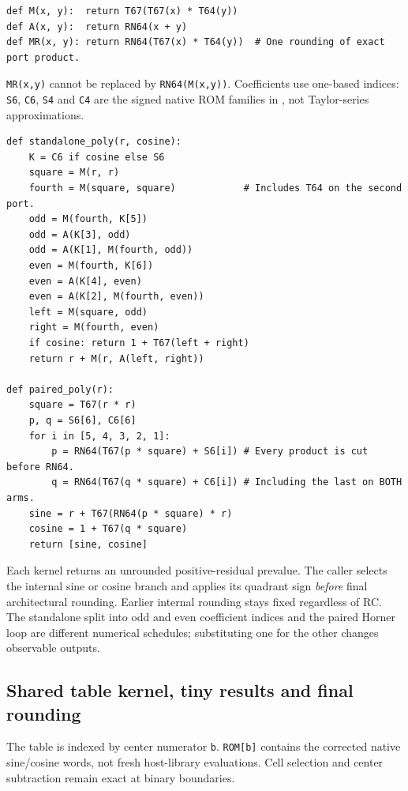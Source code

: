 \documentclass[11pt]{article}
\begin{document}
\begin{lstlisting}[style=pseudocode]
def M(x, y):  return T67(T67(x) * T64(y))
def A(x, y):  return RN64(x + y)
def MR(x, y): return RN64(T67(x) * T64(y))  # One rounding of exact port product.
\end{lstlisting}

\noindent \texttt{MR(x,y)} cannot be replaced by \texttt{RN64(M(x,y))}.
Coefficients use one-based indices: \texttt{S6}, \texttt{C6}, \texttt{S4}
and \texttt{C4} are the signed native ROM families in
, not Taylor-series approximations.

\begin{lstlisting}[style=pseudocode]
def standalone_poly(r, cosine):
    K = C6 if cosine else S6
    square = M(r, r)
    fourth = M(square, square)            # Includes T64 on the second port.
    odd = M(fourth, K[5])
    odd = A(K[3], odd)
    odd = A(K[1], M(fourth, odd))
    even = M(fourth, K[6])
    even = A(K[4], even)
    even = A(K[2], M(fourth, even))
    left = M(square, odd)
    right = M(fourth, even)
    if cosine: return 1 + T67(left + right)
    return r + M(r, A(left, right))

def paired_poly(r):
    square = T67(r * r)
    p, q = S6[6], C6[6]
    for i in [5, 4, 3, 2, 1]:
        p = RN64(T67(p * square) + S6[i]) # Every product is cut before RN64.
        q = RN64(T67(q * square) + C6[i]) # Including the last on BOTH arms.
    sine = r + T67(RN64(p * square) * r)
    cosine = 1 + T67(q * square)
    return [sine, cosine]
\end{lstlisting}

\noindent Each kernel returns an unrounded positive-residual prevalue.
The caller selects the internal sine or cosine branch and applies its
quadrant sign \emph{before} final architectural rounding. Earlier internal
rounding stays fixed regardless of RC. The standalone split into odd and
even coefficient indices and the paired Horner loop are different numerical
schedules; substituting one for the other changes observable outputs.

\clearpage
\subsection{Shared table kernel, tiny results and final rounding}

The table is indexed by center numerator \texttt{b}. \texttt{ROM[b]} contains
the corrected native sine/cosine words, not fresh host-library evaluations.
Cell selection and center subtraction remain exact at binary boundaries.
\end{document}
